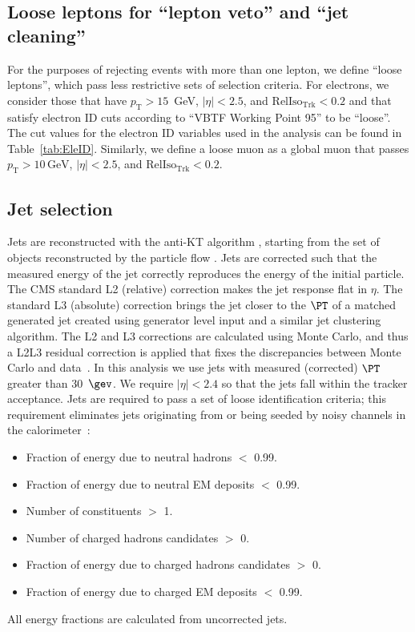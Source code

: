 \subsection{Loose leptons for ``lepton veto'' and ``jet cleaning''}
For the purposes of rejecting events with more than one lepton, we
define ``loose leptons'', which pass less restrictive sets of selection
criteria. For electrons, we consider those
that have $p_{\mathrm{T}} > 15$~GeV, $|\eta| < 2.5$, and
$\mathrm{RelIso_{\mathrm{Trk}}} < 0.2$ and that satisfy electron ID
cuts according to ``VBTF Working Point 95'' to be ``loose''. The cut
values for the electron ID variables used in the analysis can be found
in Table~\ref{tab:EleID}. Similarly, we define a loose muon as a global muon that passes
$p_{\mathrm{T}} > 10\,\mathrm{GeV}$, $|\eta| < 2.5$, and
$\mathrm{RelIso_{\mathrm{Trk}}} < 0.2$.
\subsection{Jet selection}
\label{sec:firstStep_jets}
Jets are reconstructed with the anti-KT algorithm \cite{cacciari}, 
starting from the set of objects reconstructed by the particle 
flow \cite{pflow,CMS-PAS-JME-10-003,CMS-PAS-PFT-10-002}.
Jets are corrected such that the measured energy of the jet 
correctly reproduces the energy of the initial particle. 
The CMS standard L2 (relative) correction makes the jet response flat in $\eta$.
The standard L3 (absolute) correction brings the jet closer to the $\PT$ of 
a matched generated jet created using generator level input and a similar 
jet clustering algorithm.
The L2 and L3 corrections are calculated using Monte Carlo, and thus a 
L2L3 residual correction is applied that fixes the discrepancies between 
Monte Carlo and data~\cite{newjes-cms}.
In this analysis we use jets with measured (corrected) $\PT$  
greater than 30~$\gev$. 
We require $|\eta| < 2.4$ so that the jets fall within the
tracker acceptance.  
Jets are required to pass a set of loose identification
criteria; this requirement eliminates jets originating from or being seeded by
noisy channels in the calorimeter~\cite{Chatrchyan:2009hy}: 
\begin{itemize}
\item Fraction of energy due to neutral hadrons $<$ 0.99.
\item Fraction of energy due to neutral EM deposits $<$ 0.99.
\item Number of constituents $>$ 1.
\item Number of charged hadrons candidates $>$ 0.
\item Fraction of energy due to charged hadrons candidates $>$ 0.
\item Fraction of energy due to charged EM deposits $<$ 0.99.
\end{itemize}
All energy fractions are calculated from uncorrected jets.

